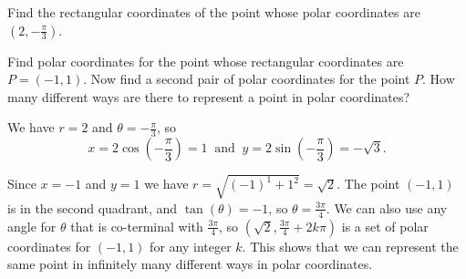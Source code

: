 \begin{activity} \label{A:11.5.1} \ba
	\item Find the rectangular coordinates of the point whose polar coordinates are $\left(2, -\frac{\pi}{3}\right)$.



	\item Find polar coordinates for the point whose rectangular coordinates are $P=(-1, 1)$. Now find a second pair of polar coordinates for the point $P$. How many different ways are there to represent a point in polar coordinates?
	
	
	
	\ea

\end{activity}
\begin{smallhint}

\end{smallhint}
\begin{bighint}

\end{bighint}
\begin{activitySolution}
\ba
	\item We have $r = 2$ and $\theta = -\frac{\pi}{3}$, so 
\[x = 2 \cos\left(-\frac{\pi}{3}\right) = 1 \ \text{ and } \ y = 2 \sin\left(-\frac{\pi}{3}\right) = -\sqrt{3}.\]

	\item Since $x = -1$ and $y = 1$ we have $r = \sqrt{(-1)^1 + 1^2} = \sqrt{2}$. The point $(-1,1)$ is in the second quadrant, and $\tan(\theta) = -1$, so $\theta = \frac{3\pi}{4}$. We can also use any angle for $\theta$ that is co-terminal with $\frac{3\pi}{4}$, so $\left(\sqrt{2}, \frac{3\pi}{4} + 2k \pi\right)$ is a set of polar coordinates for $(-1,1)$ for any integer $k$. This shows that we can represent the same point in infinitely many different ways in polar coordinates. 
	
	\ea
\end{activitySolution}
\aftera
